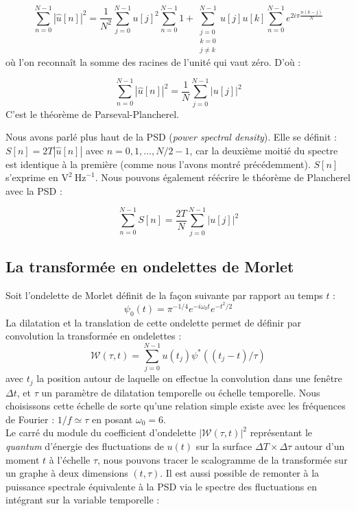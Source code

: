 \documentclass[11pt]{article}
\begin{document}
\[ \sum_{n=0}^{N-1} \left| \hat{u}[n] \right| ^2 = \frac{1}{N^2} \sum_{j=0}^{N-1} u[j]^2 \sum_{n=0}^{N-1} 1 + \sum_{\substack{j=0\\ k=0\\ j\neq k}}^{N-1} u[j]u[k] \sum_{n=0}^{N-1} e^{2i\pi \frac{n(k-j)}{N}}\]
où l'on reconnaît la somme des racines de l'unité qui vaut zéro. D'où :

\[ \sum_{n=0}^{N-1} \left| \hat{u}[n] \right| ^2 = \frac{1}{N} \sum_{j=0}^{N-1} \left| u[j]\right|^2\]
C'est le théorème de Parseval-Plancherel.

Nous avons parlé plus haut de la PSD (\emph{power spectral density}).
Elle se définit : \(S[n] = 2T \left| \hat{u}[n] \right|\) avec
\(n = 0,1, \ldots, N/2-1\), car la deuxième moitié du spectre est
identique à la première (comme nous l'avons montré précédemment).
\(S[n]\) s'exprime en \(\text{V}^2 ~\text{Hz}^{-1}\). Nous pouvons
également réécrire le théorème de Plancherel avec la PSD :

\[ \sum_{n=0}^{N-1} S[n] = \frac{2T}{N} \sum_{j=0}^{N-1} \left| u[j]\right|^2\]

    \hypertarget{la-transformuxe9e-en-ondelettes-de-morlet}{%
\subsection{La transformée en ondelettes de
Morlet}\label{la-transformuxe9e-en-ondelettes-de-morlet}}

    Soit l'ondelette de Morlet définit de la façon suivante par rapport au
temps \(t\) : \[ \psi_0 (t) = \pi^{-1/4} e^{-i \omega_0 t} e^{-t^2/2}\]
La dilatation et la translation de cette ondelette permet de définir par
convolution la transformée en ondelettes :
\[\mathcal{W}(\tau, t) = \sum_{j=0}^{N-1} u(t_j) \psi^*((t_j - t)/\tau)\]
avec \(t_j\) la position autour de laquelle on effectue la convolution
dans une fenêtre \(\Delta t\), et \(\tau\) un paramètre de dilatation
temporelle ou échelle temporelle. Nous choisissons cette échelle de
sorte qu'une relation simple existe avec les fréquences de Fourier :
\(1/f \simeq \tau\) en posant \(\omega_0 = 6\).\\
Le carré du module du coefficient d'ondelette
\(\left| \mathcal{W}(\tau, t) \right|^2\) représentant le \emph{quantum}
d'énergie des fluctuations de \(u(t)\) sur la surface
\(\Delta T \times \Delta \tau\) autour d'un moment \(t\) à l'échelle
\(\tau\), nous pouvons tracer le scalogramme de la transformée sur un
graphe à deux dimensions \((t,\tau)\). Il est aussi possible de remonter
à la puissance spectrale équivalente à la PSD via le spectre des
fluctuations en intégrant sur la variable temporelle :
\end{document}
